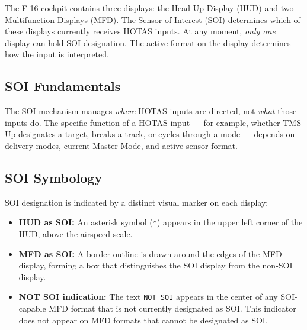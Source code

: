 \documentclass[11pt, a4paper, twoside]{report}
\begin{document}
The F-16 cockpit contains three displays: the Head-Up Display (HUD) and two Multifunction Displays (MFD). The Sensor of Interest (SOI) determines which of these displays currently receives HOTAS inputs. At any moment, \textit{only one} display can hold SOI designation. The active format on the display determines how the input is interpreted.

\subsection{SOI Fundamentals}
\label{sec:C2-S1-S1}

The SOI mechanism manages \textit{where} HOTAS inputs are directed, not \textit{what} those inputs do. The specific function of a HOTAS input --- for example, whether TMS Up designates a target, breaks a track, or cycles through a mode --- depends on delivery modes, current Master Mode, and active sensor format.

\subsection{SOI Symbology}
\label{sec:C2-S1-S2}

SOI designation is indicated by a distinct visual marker on each display:

\begin{itemize}
	\item \textbf{HUD as SOI:} An asterisk symbol (\texttt{*}) appears in the upper left corner of the HUD, above the airspeed scale.
	\item \textbf{MFD as SOI:} A border outline is drawn around the edges of the MFD display, forming a box that distinguishes the SOI display from the non-SOI display.
	\item \textbf{NOT SOI indication:} The text \texttt{NOT SOI} appears in the center of any SOI-capable MFD format that is not currently designated as SOI. This indicator does not appear on MFD formats that cannot be designated as SOI.
\end{itemize}

\end{document}
